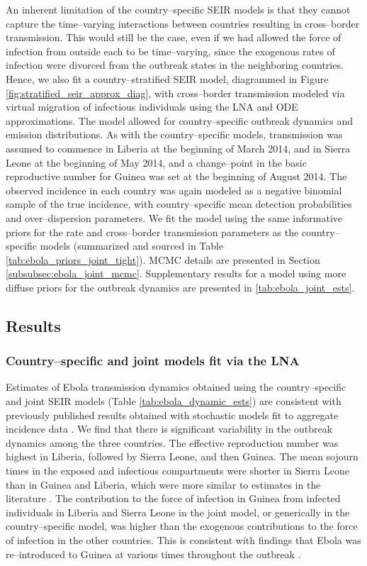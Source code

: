 An inherent limitation of the country--specific SEIR models is that they cannot capture the time--varying interactions between countries resulting in cross--border transmission. This would still be the case, even if we had allowed the force of infection from outside each to be time--varying, since the exogenous rates of infection were divorced from the outbreak states in the neighboring countries. Hence, we also fit a country--stratified SEIR model, diagrammed in Figure \ref{fig:stratified_seir_approx_diag}, with cross--border transmission modeled via virtual migration of infectious individuals using the LNA and ODE approximations. The model allowed for country--specific outbreak dynamics and emission distributions. As with the country--specific models, transmission was assumed to commence in Liberia at the beginning of March 2014, and in Sierra Leone at the beginning of May 2014, and a change--point in the basic reproductive number for Guinea was set at the beginning of August 2014. The observed incidence in each country was again modeled as a negative binomial sample of the true incidence, with country--specific mean detection probabilities and over--dispersion parameters. We fit the model using the same informative priors for the rate and cross--border transmission parameters as the country--specific models (summarized and sourced in Table \ref{tab:ebola_priors_joint_tight}). MCMC details are presented in Section \ref{subsubsec:ebola_joint_mcmc}. Supplementary results for a model using more diffuse priors for the outbreak dynamics are presented in \ref{tab:ebola_joint_ests}.

\subsection{Results}
\label{subsec:ebola_results}

\subsubsection{Country--specific and joint models fit via the LNA}
\label{subsubsec:ebola_lna_results}

Estimates of Ebola transmission dynamics obtained using the country--specific and joint SEIR models (Table \ref{tab:ebola_dynamic_ests}) are consistent with previously published results obtained with stochastic models fit to aggregate incidence data \cite{chretien2015mathematical}. We find that there is significant variability in the outbreak dynamics among the three countries. The effective reproduction number was highest in Liberia, followed by Sierra Leone, and then Guinea. The mean sojourn times in the exposed and infectious compartments were shorter in Sierra Leone than in Guinea and Liberia, which were more similar to estimates in the literature \cite{velasquez2015time}. The contribution to the force of infection in Guinea from infected individuals in Liberia and Sierra Leone in the joint model, or generically in the country--specific model, was higher than the exogenous contributions to the force of infection in the other countries. This is consistent with findings that Ebola was re--introduced to Guinea at various times throughout the outbreak \cite{dudas2017virus}. 

